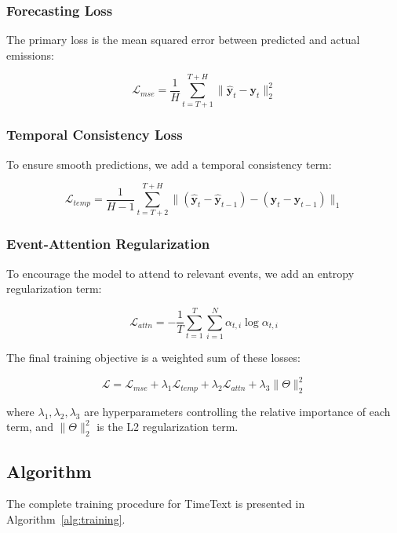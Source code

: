 \subsubsection{Forecasting Loss}
The primary loss is the mean squared error between predicted and actual emissions:

\begin{equation}
    \mathcal{L}_{mse} = \frac{1}{H} \sum_{t=T+1}^{T+H} \|\hat{\mathbf{y}}_t - \mathbf{y}_t\|_2^2
\end{equation}

\subsubsection{Temporal Consistency Loss}
To ensure smooth predictions, we add a temporal consistency term:

\begin{equation}
    \mathcal{L}_{temp} = \frac{1}{H-1} \sum_{t=T+2}^{T+H} \|(\hat{\mathbf{y}}_t - \hat{\mathbf{y}}_{t-1}) - (\mathbf{y}_t - \mathbf{y}_{t-1})\|_1
\end{equation}

\subsubsection{Event-Attention Regularization}
To encourage the model to attend to relevant events, we add an entropy regularization term:

\begin{equation}
    \mathcal{L}_{attn} = -\frac{1}{T} \sum_{t=1}^T \sum_{i=1}^N \alpha_{t,i} \log \alpha_{t,i}
\end{equation}

The final training objective is a weighted sum of these losses:

\begin{equation}
    \mathcal{L} = \mathcal{L}_{mse} + \lambda_1 \mathcal{L}_{temp} + \lambda_2 \mathcal{L}_{attn} + \lambda_3 \|\Theta\|_2^2
\end{equation}

where $\lambda_1, \lambda_2, \lambda_3$ are hyperparameters controlling the relative importance of each term, and $\|\Theta\|_2^2$ is the L2 regularization term.

\subsection{Algorithm}
The complete training procedure for TimeText is presented in Algorithm~\ref{alg:training}.

